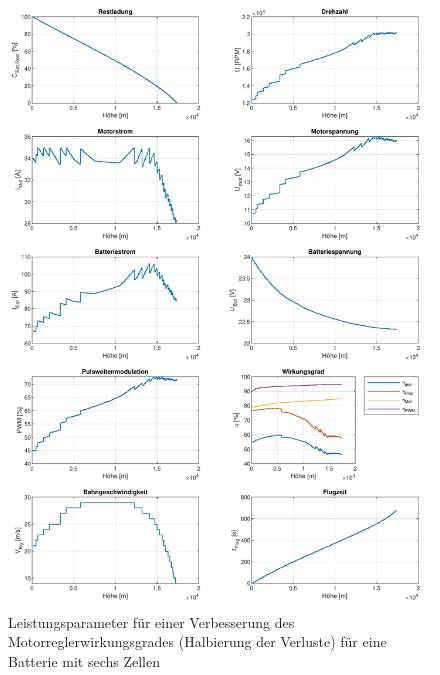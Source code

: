 \begin{appendix}
\begin{figure}[H]
\centering
	\includegraphics[scale=0.7]{Diagramme/Untersuchung_eta_pwm_halbierung_6.pdf}
	\caption{Leistungsparameter für einer Verbesserung des Motorreglerwirkungsgrades (Halbierung der Verluste) für eine Batterie mit sechs Zellen}
	\label{abb:eta_pwm_6_halb}
\end{figure}


\end{appendix}
